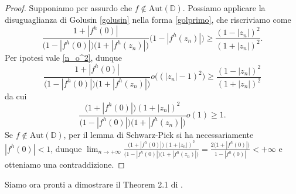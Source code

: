 \begin{proof}
  Supponiamo per assurdo che $f \not\in \text{Aut}(\mathbb{D})$. Possiamo applicare la disuguaglianza di Golusin \ref{golusin} nella forma \eqref{golprimo}, che riscriviamo come
  $$\frac{1+|f^h(0)|}{\bigl(1-|f^h(0)|\bigr)\bigl(1+|f^h(z_n)|\bigr)}\bigl(1-|f^h(z_n)|\bigr) \ge \frac{(1-|z_n|)^2}{(1+|z_n|)^2}.$$
  Per ipotesi vale \eqref{n_o^2}, dunque
  $$\frac{1+|f^h(0)|}{\bigl(1-|f^h(0)|\bigr)\bigl(1+|f^h(z_n)|\bigr)}o\bigl((|z_n|-1)^2\bigr) \ge \frac{(1-|z_n|)^2}{(1+|z_n|)^2}$$
  da cui
  $$\frac{\bigl(1+|f^h(0)|\bigr)(1+|z_n|)^2}{\bigl(1-|f^h(0)|\bigr)\bigl(1+|f^h(z_n)|\bigr)}o(1) \ge 1.$$
  Se $f \not\in \text{Aut}(\mathbb{D})$, per il lemma di Schwarz-Pick si ha necessariamente $|f^h(0)|<1$, dunque $\displaystyle \lim_{n \longrightarrow +\infty} \frac{\bigl(1+|f^h(0)|\bigr)(1+|z_n|)^2}{\bigl(1-|f^h(0)|\bigr)\bigl(1+|f^h(z_n)|\bigr)}=\frac{2\bigl(1+|f^h(0)|\bigr)}{1-|f^h(0)|} < +\infty$ e otteniamo una contraddizione.
\end{proof}

Siamo ora pronti a dimostrare il Theorem 2.1 di \cite{BK}.
